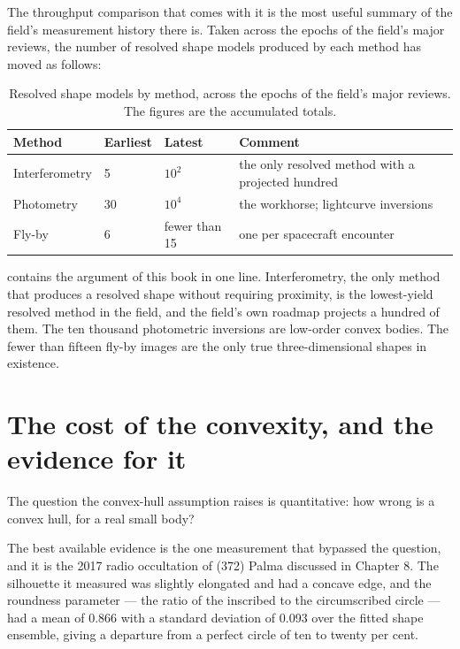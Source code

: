 The throughput comparison that comes with it is the most useful summary of
the field's measurement history there is. Taken across the epochs of the
field's major reviews, the number of resolved shape models produced by each
method has moved as follows:

\begin{table}[!htbp]
\centering
\small
\caption{Resolved shape models by method, across the epochs of the field's
major reviews. The figures are the accumulated totals.}
\label{tab:throughput}
\begin{tabularx}{\textwidth}{@{}P{1.15in}P{0.78in}P{0.78in}Y@{}}
\toprule
{}
\textbf{Method} & \textbf{Earliest} & \textbf{Latest} & \textbf{Comment} \\
\midrule
Interferometry & 5 & \(10^{2}\) & the only resolved method with a
projected hundred \\
Photometry & 30 & \(10^{4}\) & the workhorse; lightcurve inversions \\
Fly-by & 6 & fewer than 15 & one per spacecraft encounter \\
\bottomrule
\end{tabularx}
\end{table}

 contains the argument of this book in one line.
Interferometry, the only method that produces a resolved shape without
requiring proximity, is the lowest-yield resolved method in the field, and
the field's own roadmap projects a hundred of them. The ten thousand
photometric inversions are low-order convex bodies. The fewer than fifteen
fly-by images are the only true three-dimensional shapes in existence.

\section{The cost of the convexity, and the evidence for it}

The question the convex-hull assumption raises is quantitative: how wrong is
a convex hull, for a real small body?

The best available evidence is the one measurement that bypassed the
question, and it is the 2017 radio occultation of (372) Palma discussed in
Chapter 8. The silhouette it measured was slightly elongated and had a
concave edge, and the roundness parameter --- the ratio of the inscribed to
the circumscribed circle --- had a mean of 0.866 with a standard deviation of
0.093 over the fitted shape ensemble, giving a departure from a perfect
circle of ten to twenty per cent.

